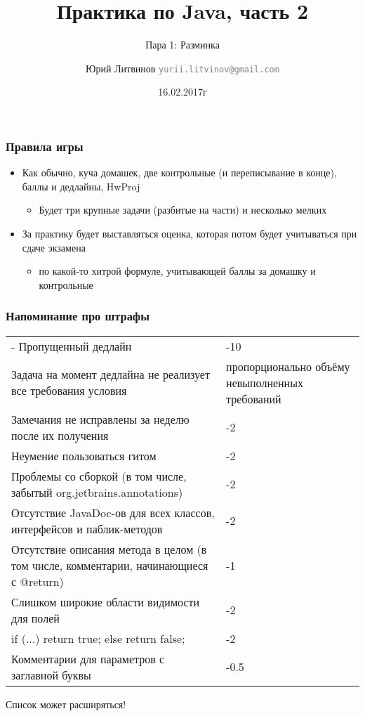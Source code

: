 \documentclass[xetex,mathserif,serif]{beamer}
\title{Практика по Java, часть 2}
\subtitle{Пара 1: Разминка}
\author[Юрий Литвинов]{Юрий Литвинов \newline \textcolor{gray}{\small\texttt{yurii.litvinov@gmail.com}}}
\date{16.02.2017г}
\begin{document}
	
	\frame{\titlepage}
	
	\begin{frame}
		\frametitle{Правила игры}
		\begin{itemize}
			\item Как обычно, куча домашек, две контрольные (и переписывание в конце), баллы и дедлайны, HwProj
			\begin{itemize}
				\item Будет три крупные задачи (разбитые на части) и несколько мелких
			\end{itemize}
			\item За практику будет выставляться оценка, которая потом будет учитываться при сдаче экзамена
			\begin{itemize}
				\item по какой-то хитрой формуле, учитывающей баллы за домашку и контрольные
			\end{itemize}
		\end{itemize}
	\end{frame}

	\begin{frame}
		\frametitle{Напоминание про штрафы}
		\begin{scriptsize}
			\begin{tabu} {| X[1 l p] | X[0.3 l p] |}
				\tabucline-
				\everyrow{\tabucline-}
				Пропущенный дедлайн                                                                   & -10 \\
				Задача на момент дедлайна не реализует все требования условия                         & пропорционально объёму невыполненных требований \\
				Замечания не исправлены за неделю после их получения                                  & -2 \\
				Неумение пользоваться гитом                                                           & -2 \\
				Проблемы со сборкой (в том числе, забытый org.jetbrains.annotations)                  & -2 \\
				Отсутствие JavaDoc-ов для всех классов, интерфейсов и паблик-методов                  & -2 \\
				Отсутствие описания метода в целом (в том числе, комментарии, начинающиеся с @return) & -1 \\
				Слишком широкие области видимости для полей                                           & -2 \\
				if (...) return true; else return false;                                              & -2 \\
				Комментарии для параметров с заглавной буквы                                          & -0.5 \\
			\end{tabu}
		\end{scriptsize}
		\begin{center}
			\scriptsize{Список может расширяться!}
		\end{center}
	\end{frame}
\end{document}
